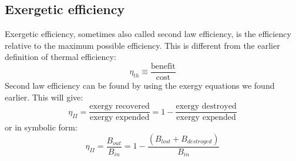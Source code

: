 \documentclass[11pt, a4paper]{article}
\begin{document}
\subsection{Exergetic efficiency}
Exergetic efficiency, sometimes also called second law efficiency, is the efficiency relative to the maximum possible efficiency. This is different from the earlier definition of thermal efficiency:
\begin{equation}
  \eta_{th} \equiv \frac{\text{benefit}}{\text{cost}}
\end{equation}
Second law efficiency can be found by using the exergy equations we found earlier. This will give:
\begin{equation}
  \eta_{II} = \frac{\text{exergy recovered}}{\text{exergy expended}} = 1 - \frac{\text{exergy destroyed}}{\text{exergy expended}}
\end{equation}
or in symbolic form:
\begin{equation}
  \eta_{II} = \frac{B_{out}}{B_{in}} = 1 - \frac{(B_{lost} + B_{destroyed})}{B_{in}}
\end{equation}
\end{document}
